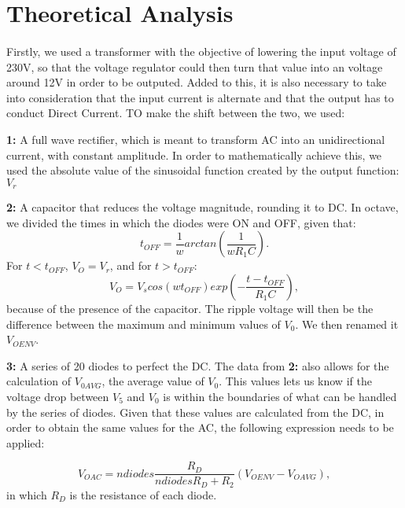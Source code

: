 \section{Theoretical Analysis}
\label{sec:analysis}
\paragraph{}
\par Firstly, we used a transformer with the objective of lowering the input voltage of 230V, so that the voltage regulator could then turn that value into an voltage around 12V in order to be outputed. Added to this, it is also necessary to take into consideration that the input current is alternate and that the output has to conduct Direct Current. TO make the shift between the two, we used:
\par \textbf{1:} A full wave rectifier, which is meant to transform AC into an unidirectional current, with constant amplitude. In order to mathematically achieve this, we used the absolute value of the sinusoidal function created by the output function: $V_r$



\par \textbf{2:} A capacitor that reduces the voltage magnitude, rounding it to DC. In octave, we divided the times in which the diodes were ON and OFF, given that: 
\begin{equation}
	t_{OFF} = \frac{1}{w} arctan(\frac{1}{w R_1 C}). 
\end{equation}
For $t<t_{OFF}$, $V_O=V_r$, and for $t>t_{OFF}$:
\begin{equation}
	V_O=V_s cos(w t_{OFF}) exp(-\frac{t-t_{OFF}}{R_1 C}), 
\end{equation}
because of the presence of the capacitor. The ripple voltage will then be the difference between the maximum and minimum values of $V_0$. We then renamed it $V_{OENV}$.

\par \textbf{3:} A series of 20 diodes to perfect the DC. The data from \textbf{2:} also allows for the calculation of $V_{0AVG}$, the average value of $V_0$. This values lets us know if the voltage drop between $V_5$ and $V_0$ is within the boundaries of what can be handled by the series of diodes. Given that these values are calculated from the DC, in order to obtain the same values for the AC, the following expression needs to be applied:

\begin{equation}
	V_{OAC} = ndiodes \frac{R_D}{ndiodes R_D + R_2}(V_{OENV} - V_{OAVG}),
\end{equation}
in which $R_D$ is the resistance of each diode.

